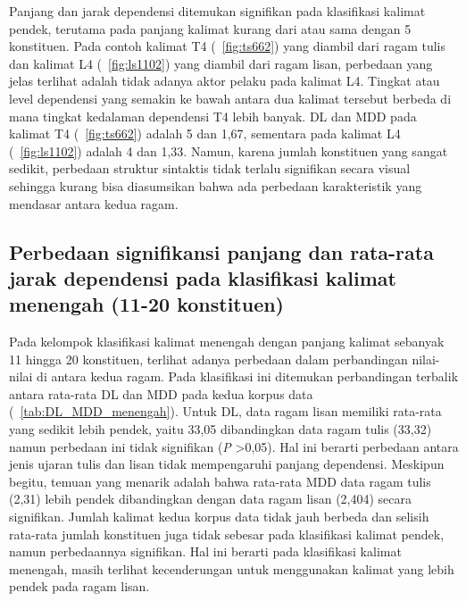 Panjang dan jarak dependensi ditemukan signifikan pada klasifikasi kalimat pendek, terutama pada panjang kalimat kurang dari atau sama dengan 5 konstituen. Pada contoh kalimat T4 (\pic~\ref{fig:ts662}) yang diambil dari ragam tulis dan kalimat L4 (\pic~\ref{fig:ls1102}) yang diambil dari ragam lisan, perbedaan yang jelas terlihat adalah tidak adanya aktor pelaku pada kalimat L4. Tingkat atau level dependensi yang semakin ke bawah antara dua kalimat tersebut berbeda di mana tingkat kedalaman dependensi T4 lebih banyak. DL dan MDD pada kalimat T4 (\pic~\ref{fig:ts662}) adalah 5 dan 1,67, sementara pada kalimat L4 (\pic~\ref{fig:ls1102}) adalah 4 dan 1,33. Namun, karena jumlah konstituen yang sangat sedikit, perbedaan struktur sintaktis tidak terlalu signifikan secara visual sehingga kurang bisa diasumsikan bahwa ada perbedaan karakteristik yang mendasar antara kedua ragam. 

\subsection{Perbedaan signifikansi panjang dan rata-rata jarak dependensi pada klasifikasi kalimat menengah (11-20 konstituen)}
Pada kelompok klasifikasi kalimat menengah dengan panjang kalimat sebanyak 11 hingga 20 konstituen, terlihat adanya perbedaan dalam perbandingan nilai-nilai di antara kedua ragam. Pada klasifikasi ini ditemukan perbandingan terbalik antara rata-rata DL dan MDD pada kedua korpus data (\tab~\ref{tab:DL_MDD_menengah}). Untuk DL, data ragam lisan memiliki rata-rata yang sedikit lebih pendek, yaitu 33,05 dibandingkan data ragam tulis (33,32) namun perbedaan ini tidak signifikan (\textit{P} \textgreater 0,05). Hal ini berarti perbedaan antara jenis ujaran tulis dan lisan tidak mempengaruhi panjang dependensi. Meskipun begitu, temuan yang menarik adalah bahwa rata-rata MDD data ragam tulis (2,31) lebih pendek dibandingkan dengan data ragam lisan (2,404) secara signifikan. Jumlah kalimat kedua korpus data tidak jauh berbeda dan selisih rata-rata jumlah konstituen juga tidak sebesar pada klasifikasi kalimat pendek, namun perbedaannya signifikan. Hal ini berarti pada klasifikasi kalimat menengah, masih terlihat kecenderungan untuk menggunakan kalimat yang lebih pendek pada ragam lisan.  

